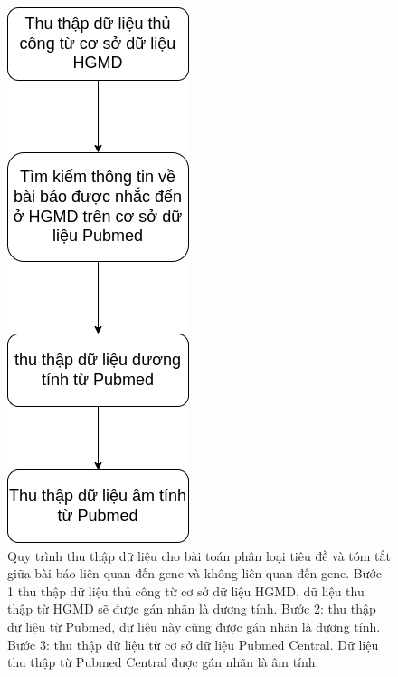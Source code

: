 \documentclass[../DoAn.tex]{subfiles}
\begin{document}
\begin{figure}
\centering
\includegraphics[width=0.4\linewidth]{Hinh_ve/thuthapdulieu.png}
\caption{Quy trình thu thập dữ liệu cho bài toán phân loại tiêu đề và tóm tắt giữa bài báo liên quan đến gene và không liên quan đến gene. Bước 1 thu thập dữ liệu thủ công từ cơ sở dữ liệu HGMD, dữ liệu thu thập từ HGMD sẽ được gán nhãn là dương tính. Bước 2: thu thập dữ liệu từ Pubmed, dữ liệu này cũng được gán nhãn là dương tính. Bước 3: thu thập dữ liệu từ cơ sở dữ liệu Pubmed Central. Dữ liệu thu thập từ Pubmed Central được gán nhãn là âm tính.}
\label{fig:thuthaphgmdpubmed}
\end{figure}
\end{document}
